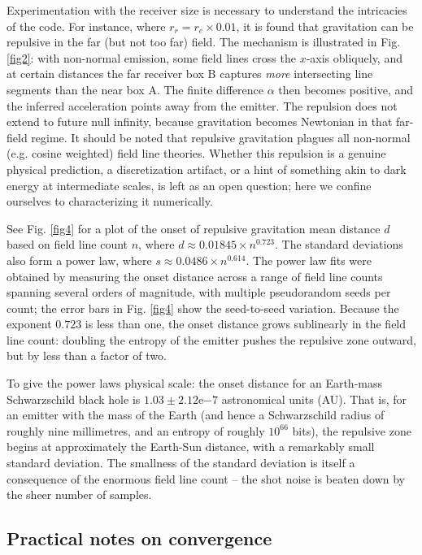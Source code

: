 \documentclass[10pt]{article}
\begin{document}
Experimentation with the receiver size is necessary to understand the intricacies of the code.
For instance, where $r_{r} = r_{e} \times 0.01$, it is found that gravitation can be repulsive in the far (but not too far) field.
The mechanism is illustrated in Fig. \ref{fig2}: with non-normal emission, some field lines cross the $x$-axis obliquely, and at certain distances the far receiver box B captures {\em more} intersecting line segments than the near box A.
The finite difference $\alpha$ then becomes positive, and the inferred acceleration points away from the emitter.
The repulsion does not extend to future null infinity, because gravitation becomes Newtonian in that far-field regime.
It should be noted that repulsive gravitation plagues all non-normal (e.g. cosine weighted) field line theories.
Whether this repulsion is a genuine physical prediction, a discretization artifact, or a hint of something akin to dark energy at intermediate scales, is left as an open question; here we confine ourselves to characterizing it numerically.

See Fig. \ref{fig4} for a plot of the onset of repulsive gravitation mean distance $d$ based on field line count $n$, where $d \approx 0.01845 \times n^{0.723}$.
The standard deviations also form a power law, where $s \approx  0.0486 \times n^{0.614}$.
The power law fits were obtained by measuring the onset distance across a range of field line counts spanning several orders of magnitude, with multiple pseudorandom seeds per count; the error bars in Fig. \ref{fig4} show the seed-to-seed variation.
Because the exponent $0.723$ is less than one, the onset distance grows sublinearly in the field line count: doubling the entropy of the emitter pushes the repulsive zone outward, but by less than a factor of two.

To give the power laws physical scale: the onset distance for an Earth-mass Schwarzschild black hole is $1.03 \pm 2.12\mathrm{e}{-7}$ astronomical units (AU).
That is, for an emitter with the mass of the Earth (and hence a Schwarzschild radius of roughly nine millimetres, and an entropy of roughly $10^{66}$ bits), the repulsive zone begins at approximately the Earth-Sun distance, with a remarkably small standard deviation.
The smallness of the standard deviation is itself a consequence of the enormous field line count -- the shot noise is beaten down by the sheer number of samples.

\subsection{Practical notes on convergence}
\end{document}
